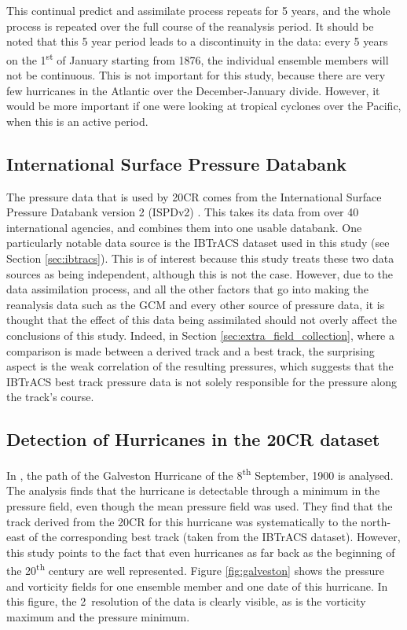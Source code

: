 \documentclass[pdftex,12pt,a4paper]{report}
\newcommand{\ts}{\textsuperscript}
\begin{document}
This continual predict and assimilate process repeats for 5 years, and the whole process is repeated
over the full course of the reanalysis period. It should be noted that this 5 year period leads to a
discontinuity in the data: every 5 years on the 1\ts{st} of January starting from 1876, the
individual ensemble members will not be continuous. This is not important for this study, because
there are very few hurricanes in the Atlantic over the December-January divide. However, it would be
more important if one were looking at tropical cyclones over the Pacific, when this is an active
period.

\subsection{International Surface Pressure Databank}
The pressure data that is used by 20CR comes from the International Surface Pressure Databank
version 2 (ISPDv2) \parencite{yin2008international}. This takes its data from over 40 international
agencies, and combines them into one usable databank. One particularly notable data source is the
IBTrACS dataset used in this study (see Section \ref{sec:ibtracs}). This is of interest because this
study treats these two data sources as being independent, although this is not the case. However,
due to the data assimilation process, and all the other factors that go into making the reanalysis
data such as the GCM and every other source of pressure data, it is thought that the effect of this
data being assimilated should not overly affect the conclusions of this study. Indeed, in Section
\ref{sec:extra_field_collection}, where a comparison is made between a derived track and a best
track, the surprising aspect is the weak correlation of the resulting pressures, which suggests that
the IBTrACS best track pressure data is not solely responsible for the pressure along the track's
course.


\subsection{Detection of Hurricanes in the 20CR dataset}

In \textcite{neff2013analysis}, the path of the Galveston Hurricane of the 8\ts{th} September, 1900
is analysed. The analysis finds that the hurricane is detectable through a minimum in the pressure
field, even though the mean pressure field was used. They find that the track derived from the 20CR
for this hurricane was systematically to the north-east of the corresponding best track (taken from
the IBTrACS dataset). However, this study points to the fact that even hurricanes as far back as the
beginning of the 20\ts{th} century are well represented. Figure \ref{fig:galveston} shows the
pressure and vorticity fields for one ensemble member and one date of this hurricane. In this
figure, the 2\textdegree\ resolution of the data is clearly visible, as is the vorticity maximum and
the pressure minimum.
\end{document}
